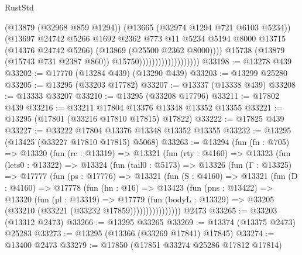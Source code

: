\begin{lexlean}{RustStd}
\begin{coremodule}
                                            (@13879 (@32968 @859 @1294))
                                            (@13665 (@32974 @1294 @721 @6103 @5234))
                                            (@13697
                                              @24742
                                              @5266
                                              @1692
                                              @2362
                                              @773
                                              @11
                                              @5234
                                              @5194
                                              @8000
                                              @13715
                                              (@14376 @24742 @5266)
                                              (@13869 (@25500 @2362 @8000))))
                                          @15738
                                          (@13879 (@15743 @731 @2387 @860))
                                          @15750)))))))))))))))))))
@33198 := @13278 @439
@33202 := @17770 (@13284 @439) (@13290 @439)
@33203 := @13299 @25280
@33205 := @13295 (@33203 @17782)
@33207 := @13337 (@13338 @439)
@33208 := @13333 @33207
@33210 := @13295 (@33208 @17796)
@33211 := @17802 @439
@33216 := @33211 @17804 @13376 @13348 @13352 @13355
@33221 := @13295 (@17801 (@33216 @17810 @17815) @17822)
@33222 := @17825 @439
@33227 := @33222 @17804 @13376 @13348 @13352 @13355
@33232 := @13295 (@13425 (@33227 @17810 @17815) @5068)
@33263 := @13294
    (fun (fn : @705) =>
    @13320
      (fun (rc : @13319) =>
      @13321
        (fun (rty : @4160) =>
        @13323
          (fun (lets0 : @13322) =>
          @13324
            (fun (tail0 : @5173) =>
            @13326
              (fun (Γ : @13325) =>
              @17777
                (fun (ps : @17776) =>
                @13321
                  (fun (S : @4160) =>
                  @13321
                    (fun (D : @4160) =>
                    @17778
                      (fun (hn : @16) =>
                      @13423
                        (fun (pns : @13422) =>
                        @13320
                          (fun (pl : @13319) =>
                          @17779
                            (fun (bodyL : @13329) =>
                            @33205 (@33210 (@33221 (@33232 @17859))))))))))))))))
    @2473
@33265 := @33203 (@13312 @2473)
@33266 := @13295 @33265
@33269 := @13374 (@13375 @2473) @25283
@33273 := @13295 (@13366 (@33269 @17841) @17845)
@33274 := @13400 @2473
@33279 := @17850 (@17851 @33274 @25286 @17812 @17814)

\end{coremodule}
\end{lexlean}
